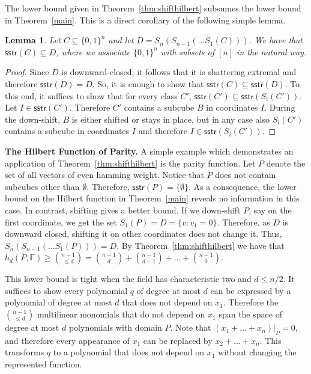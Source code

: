 \documentclass[11pt]{article}
\newtheorem{lemma}[theorem]{Lemma}
\theoremstyle{definition}
\newcommand{\1}{\mathbf{1}}
\newcommand{\F}{{\mathbb F}}
\renewcommand{\leq}{\leqslant}
\renewcommand{\geq}{\geqslant}
\newcommand{\sstr}{\mathsf{sstr}}
\newcommand{\setof}[1]{#1}
\begin{document}
The lower bound given in Theorem~\ref{thm:shifthilbert} subsumes the lower bound in Theorem~\ref{main}. This is a direct corollary of the following simple lemma.
\begin{lemma}
Let $C\subseteq\{0,1\}^n$ and let $D=S_{n}(S_{n-1}(\ldots S_1(C)))$.
We have that
$\sstr(C)\subseteq \setof{D}$, where we associate $\{0,1\}^n$ with subsets of $[n]$ in the natural way.
\end{lemma}
\begin{proof}
Since $\setof{D}$ is downward-closed, it follows that it is shattering extremal and therefore $\sstr(D)=\setof{D}$.
So, it is enough to show that $\sstr(C)\subseteq\sstr(D)$. 
To this end, it suffices to show that for every class $C'$, $\sstr(C')\subseteq\sstr(S_i(C'))$.
Let $I\in\sstr(C')$. Therefore $C'$ contains a subcube $B$ in coordinates $I$.
During the down-shift, $B$ is either shifted or stays in place, but in any case also $S_i(C')$ contains a subcube in coordinates $I$
and therefore $I\in\sstr(S_i(C'))$.
\end{proof}

\noindent
{\bf The Hilbert Function of Parity.} 
A simple example which demonstrates an application of Theorem~\ref{thm:shifthilbert}
is the parity function. Let $P$ denote the set of all vectors of even hamming weight. Notice that $P$ does not contain  subcubes other than $\emptyset$.  Therefore, $\sstr(P)=\{\emptyset\}$. As a consequence, the lower bound on the Hilbert function in Theorem~\ref{main} reveals no information in this case.  In contrast, shifting gives a better bound.  If we down-shift $P$, say on the first coordinate, we get the set $S_1(P) = D=\{v: v_1=0\}$. Therefore, as $D$ is downward closed, shifting it on other coordinates does not change it. Thus, $S_{n}(S_{n-1}(\ldots S_{1}(P)))=D$. By %
Theorem~\ref{thm:shifthilbert} we have that $h_d(P,\F)\geq {{n-1}\choose {\leq d}} = {{n-1}\choose {d}} + {{n-1}\choose {d -1}} + \ldots + {{n-1}\choose {0}} $. 

This lower bound is tight when the field has characteristic two and $d\leq n/2$.  It suffices to show every polynomial $q$ of degree at most $d$ can be expressed by a polynomial of degree at most $d$ that does not depend on $x_1$. Therefore the ${{n-1}\choose {\leq d}}$ multilinear monomials that do not depend on $x_1$ span the space of degree at most $d$ polynomials with domain $P$.
Note that $(x_1+\ldots+x_n)|_P = 0$, and therefore every appearance of $x_1$
can be replaced by $x_2+\ldots+x_n$. This transforms $q$ to a polynomial that does not depend on $x_1$ without changing the represented function.
\end{document}
